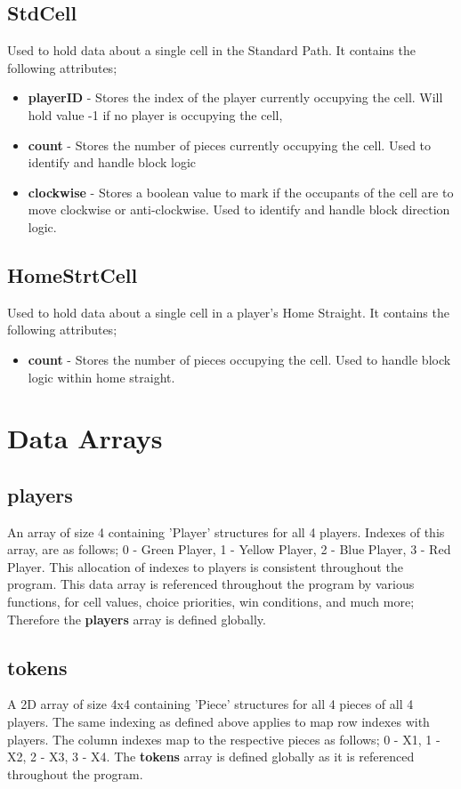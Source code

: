 \documentclass{article}
\begin{document}
\subsection{StdCell}
Used to hold data about a single cell in the Standard Path.
It contains the following attributes;
\begin{itemize}
    \item \textbf{playerID} - Stores the index of the player currently occupying the cell. Will hold value -1 if no player is occupying the cell,
    \item \textbf{count} - Stores the number of pieces currently occupying the cell. Used to identify and handle block logic
    \item \textbf{clockwise} - Stores a boolean value to mark if the occupants of the cell are to move clockwise or anti-clockwise. Used to identify and handle block direction logic.
\end{itemize}

\subsection{HomeStrtCell}
Used to hold data about a single cell in a player's Home Straight.
It contains the following attributes;
\begin{itemize}
    \item \textbf{count} - Stores the number of pieces occupying the cell. Used to handle block logic within home straight.
\end{itemize}

\section{Data Arrays}
\subsection{players}
An array of size 4 containing 'Player' structures for all 4 players. Indexes of this array, are as follows; 0 - Green Player, 1 - Yellow Player, 2 - Blue Player, 3 - Red Player. This allocation of indexes to players is consistent throughout the program. This data array is referenced throughout the program by various functions, for cell values, choice priorities, win conditions, and much more; Therefore the \textbf{players} array is defined globally.

\subsection{tokens}
A 2D array of size 4x4 containing 'Piece' structures for all 4 pieces of all 4 players. The same indexing as defined above applies to map row indexes with players. The column indexes map to the respective pieces as follows; 0 - X1, 1 - X2, 2 - X3, 3 - X4. The \textbf{tokens} array is defined globally as it is referenced throughout the program.
\end{document}
